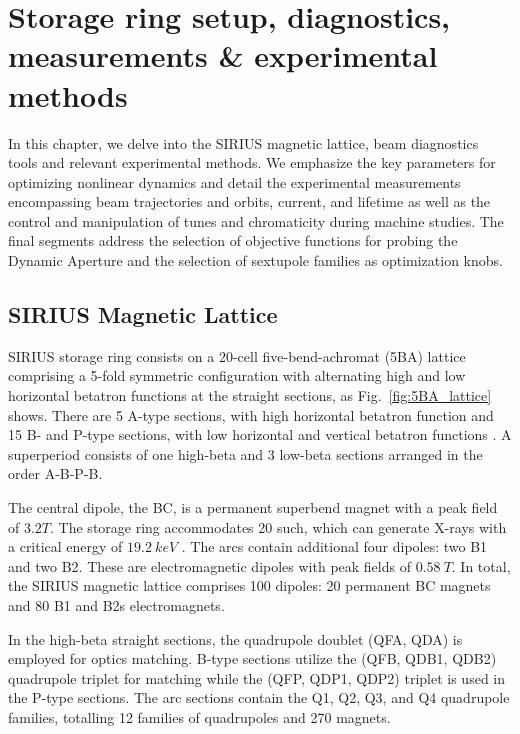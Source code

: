 \chapter{Storage ring setup, diagnostics, measurements \& experimental methods}
In this chapter, we delve into the SIRIUS magnetic lattice, beam diagnostics tools and relevant experimental methods. We emphasize the key parameters for optimizing nonlinear dynamics and detail the experimental measurements encompassing beam trajectories and orbits, current, and lifetime as well as the control and manipulation of tunes and chromaticity during machine studies. The final segments address the selection of objective functions for probing the Dynamic Aperture and the selection of sextupole families as optimization knobs.

\section{SIRIUS Magnetic Lattice}
SIRIUS storage ring consists on a 20-cell five-bend-achromat (5BA) lattice comprising a 5-fold symmetric configuration with alternating high and low horizontal betatron functions at the straight sections, as Fig.~\ref{fig:5BA_lattice} shows. There are 5 A-type sections, with high horizontal betatron function and 15 B- and P-type sections, with low horizontal and vertical betatron functions \cite{liu_new_2016}.
A superperiod consists of one high-beta and 3 low-beta sections arranged in the order A-B-P-B.

The central dipole, the BC, is a permanent superbend magnet with a peak field of $3.2\unit{T}$. The storage ring accommodates 20 such, which can generate X-rays with a critical energy of $19.2~\unit{keV}$ \cite{liu_new_2016}. The arcs contain additional four dipoles: two B1 and two B2. These are electromagnetic dipoles with peak fields of $0.58~\unit{T}$. In total, the SIRIUS magnetic lattice comprises 100 dipoles: 20 permanent BC magnets and 80 B1 and B2s electromagnets.

In the high-beta straight sections, the quadrupole doublet (QFA, QDA) is employed for optics matching. B-type sections utilize the (QFB, QDB1, QDB2) quadrupole triplet for matching while the (QFP, QDP1, QDP2) triplet is used in the P-type sections. The arc sections contain the Q1, Q2, Q3, and Q4 quadrupole families, totalling 12 families of quadrupoles and 270 magnets.

